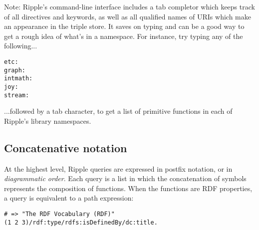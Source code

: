 \documentclass[runningheads]{llncs}
\begin{document}
Note: Ripple's command-line interface includes a tab completor which keeps track of all directives and keywords, as well as all qualified names of URIs which make an appearance in the triple store.  It saves on typing and can be a good way to get a rough idea of what's in a namespace.  For instance, try typing any of the following...

\begin{verbatim}
etc:
graph:
intmath:
joy:
stream:
\end{verbatim}

...followed by a tab character, to get a list of primitive functions in each
of Ripple's library namespaces.























\subsection{Concatenative notation}

At the highest level, Ripple queries are expressed in postfix notation, or in \textit{diagrammatic order}.  Each query is a list in which the concatenation of symbols represents the composition of functions.  When the functions are RDF properties, a query is equivalent to a path expression:

\begin{verbatim}
# => "The RDF Vocabulary (RDF)"
(1 2 3)/rdf:type/rdfs:isDefinedBy/dc:title.
\end{verbatim}
\end{document}
